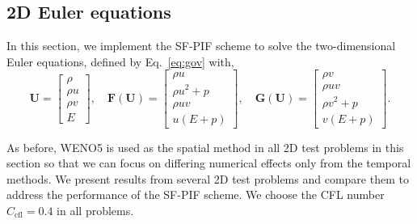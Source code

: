 \documentclass[times,preprint,3p]{elsarticle}
\newcommand{\bF}{\mathbf{F}}
\newcommand{\bG}{\mathbf{G}}
\newcommand{\bU}{\mathbf{U}}
\begin{document}
\subsection{2D Euler equations}\label{subsec:2d-euler}

In this section, we implement the SF-PIF scheme to solve the two-dimensional Euler equations,
defined by Eq.~\eqref{eq:gov} with,
%
\begin{equation}\label{eq:2d-euler}
    \bU = \begin{bmatrix}
        \rho \\
        \rho u \\
        \rho v \\
        E
    \end{bmatrix},\quad
    \bF (\bU) = \begin{bmatrix}
        \rho u \\
        \rho u^{2} + p \\
        \rho u v \\
        u \left( E + p \right)
    \end{bmatrix}, \quad
    \bG (\bU) = \begin{bmatrix}
        \rho v \\
        \rho u v \\
        \rho v^{2} + p \\
        v \left( E + p \right)
    \end{bmatrix}.
\end{equation}

As before, WENO5 is used as the spatial method
in all 2D test problems in this section
so that we can focus on differing numerical effects only from the temporal methods.
We present results from several 2D test problems
and compare them to address the performance of the SF-PIF scheme.
We choose the CFL number \( C_{\text{cfl}} = 0.4 \) in
all problems.

\end{document}
